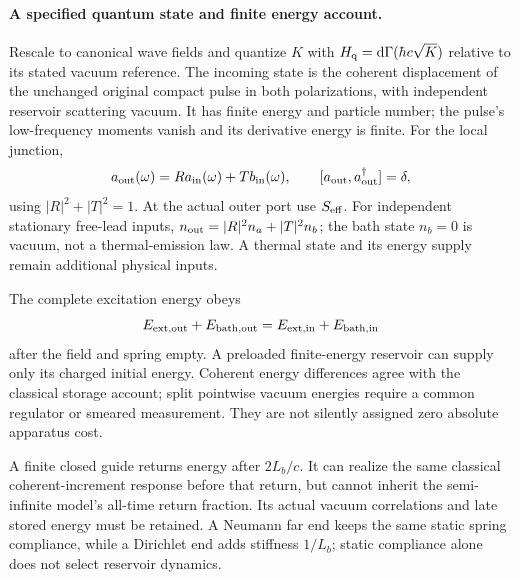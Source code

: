 \documentclass[10pt,twocolumn,letterpaper]{article}
\renewcommand{\hbar}{\mathchar'26\mkern-9mu h}
\begin{document}
\paragraph{A specified quantum state and finite energy account.}
Rescale to canonical wave fields and quantize $K$ with
$H_{\rm q}=\mathrm d\Gamma(\hbar c\sqrt K)$ relative to its stated
vacuum reference. The incoming state is the coherent displacement of the
unchanged original compact pulse in both polarizations, with independent
reservoir scattering vacuum. It has finite energy and particle number;
the pulse's low-frequency moments vanish and its derivative energy is
finite. For the local junction,
\begin{equation}
 a_{\rm out}(\omega)=R a_{\rm in}(\omega)+T b_{\rm in}(\omega),
 \qquad [a_{\rm out},a_{\rm out}^\dagger]=\delta,
\end{equation}
using $|R|^2+|T|^2=1$. At the actual outer port use $S_{\rm eff}$.
For independent stationary free-lead inputs,
$n_{\rm out}=|R|^2n_a+|T|^2n_b$; the bath state $n_b=0$ is vacuum,
not a thermal-emission law. A thermal state and its energy supply remain
additional physical inputs.

The complete excitation energy obeys
\begin{equation}
 E_{{\rm ext,out}}+E_{{\rm bath,out}}
       =E_{{\rm ext,in}}+E_{{\rm bath,in}}
\end{equation}
after the field and spring empty. A preloaded finite-energy reservoir can
supply only its charged initial energy. Coherent energy differences agree
with the classical storage account; split pointwise vacuum energies require
a common regulator or smeared measurement. They are not silently assigned
zero absolute apparatus cost.

A finite closed guide returns energy after $2L_b/c$. It can realize the
same classical coherent-increment response before that return, but cannot
inherit the semi-infinite model's all-time return fraction. Its actual
vacuum correlations and late stored energy must be retained. A Neumann
far end keeps the same static spring compliance, while a Dirichlet end adds
stiffness $1/L_b$; static compliance alone does not select reservoir dynamics.
\end{document}
